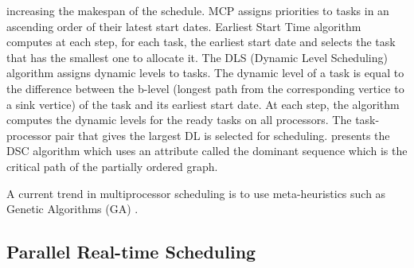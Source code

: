 increasing the makespan of the schedule. MCP assigns priorities to tasks in an ascending order of their latest start dates. \cite{hwang:1989} Earliest Start Time algorithm computes at each step, for each task, the earliest start date and selects the task that has the smallest one to allocate it. The DLS (Dynamic Level Scheduling) algorithm \cite{sih:1993} assigns dynamic levels to tasks. The dynamic level of a task is equal to the difference between the b-level (longest path from the corresponding vertice to a sink vertice) of the task and its earliest start date. At each step, the algorithm computes the dynamic levels for the ready tasks on all processors. The task-processor pair that gives the largest DL is selected for scheduling. \cite{yang:1994} presents the DSC algorithm which uses an attribute called the dominant sequence which is the critical path of the partially ordered graph.

A current trend in multiprocessor scheduling is to use meta-heuristics such as Genetic Algorithms (GA) \cite{hou:1994, wu:2004, omara:2010}.

\subsection{Parallel Real-time Scheduling}

